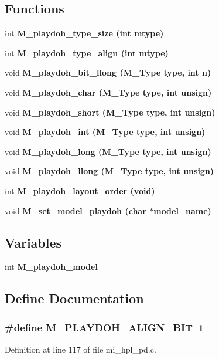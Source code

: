 \subsection*{Functions}
\begin{CompactItemize}
\item 
int \bf{M\_\-playdoh\_\-type\_\-size} (int mtype)
\item 
int \bf{M\_\-playdoh\_\-type\_\-align} (int mtype)
\item 
void \bf{M\_\-playdoh\_\-bit\_\-llong} (\bf{M\_\-Type} type, int n)
\item 
void \bf{M\_\-playdoh\_\-char} (\bf{M\_\-Type} type, int unsign)
\item 
void \bf{M\_\-playdoh\_\-short} (\bf{M\_\-Type} type, int unsign)
\item 
void \bf{M\_\-playdoh\_\-int} (\bf{M\_\-Type} type, int unsign)
\item 
void \bf{M\_\-playdoh\_\-long} (\bf{M\_\-Type} type, int unsign)
\item 
void \bf{M\_\-playdoh\_\-llong} (\bf{M\_\-Type} type, int unsign)
\item 
int \bf{M\_\-playdoh\_\-layout\_\-order} (void)
\item 
void \bf{M\_\-set\_\-model\_\-playdoh} (char $\ast$model\_\-name)
\end{CompactItemize}
\subsection*{Variables}
\begin{CompactItemize}
\item 
int \bf{M\_\-playdoh\_\-model}
\end{CompactItemize}


\subsection{Define Documentation}
\subsubsection{\setlength{\rightskip}{0pt plus 5cm}\#define M\_\-PLAYDOH\_\-ALIGN\_\-BIT~1}\label{mi__hpl__pd_8c_3a6d27ce46b21151f63f32b4d40721a8}




Definition at line 117 of file mi\_\-hpl\_\-pd.c.


